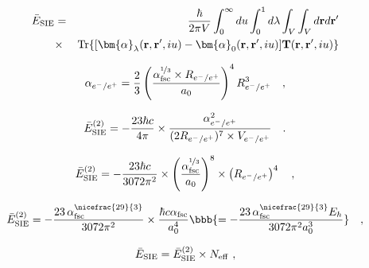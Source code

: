 
\begin{eqnarray}
\label{eqExact}
\bar{E}_{\rm SIE} &=& \frac{\hbar}{2\pi V} \int_0^{\infty} du \int_0^1 d\lambda \int_{V}\int_{V} d\mathbf{r} d\mathbf{r}' \nonumber \\
&\times& \mathrm{Tr}\{[{\bm{\alpha}}_{\lambda}(\mathbf{r},\mathbf{r}',iu)-{\bm{\alpha}}_0(\mathbf{r},\mathbf{r}',iu)] \mathbf{T}(\mathbf{r},\mathbf{r}',iu)\}
\end{eqnarray}

\begin{equation}
\label{eqAlphae-e+}
\alpha_{e^-/e^+} = \frac{2}{3} \left(\frac{\alpha_{\rm fsc}^{\nicefrac{1}{3}} \times R_{e^-/e^+}}{a_0}\right)^4 R_{e^-/e^+}^3 \quad ,
\end{equation}

\begin{equation}
\bar{E}_{\rm SIE}^{(2)} = - \frac{23 \hbar c}{4\pi} \times \frac{\alpha_{e^-/e^+}^2}{(2 R_{e^-/e^+})^7 \times V_{e^-/e^+}} \quad .  
\label{eqC2body}
\end{equation}

\begin{equation}
\bar{E}_{\rm SIE}^{(2)} = - \frac{23 \hbar c}{3072 \pi^2} \times \left(\frac{\alpha_{\rm fsc}^{\nicefrac{1}{3}}}{a_0}\right)^8 \times \left(R_{e^-/e^+}\right)^4  \quad ,  
\label{eqC2body_R4}
\end{equation}

\begin{equation}
\bar{E}_{\rm SIE}^{(2)} = - \frac{23\, \alpha_{\rm fsc}^{\nicefrac{29}{3}}}{3072 \pi^2} \times \frac{\hbar c \alpha_{\rm fsc}}{a_0^4} \bbb{ = - \frac{23\, \alpha_{\rm fsc}^{\nicefrac{29}{3}} E_h}{3072 \pi^2 a_0^3}} \quad ,
\label{eqC2bodynum}
\end{equation}

\begin{equation}
\bar{E}_{\rm SIE} = \bar{E}_{\rm SIE}^{(2)} \times N_{\rm eff}\ ,
\label{E_SIE_N_eff}
\end{equation}

